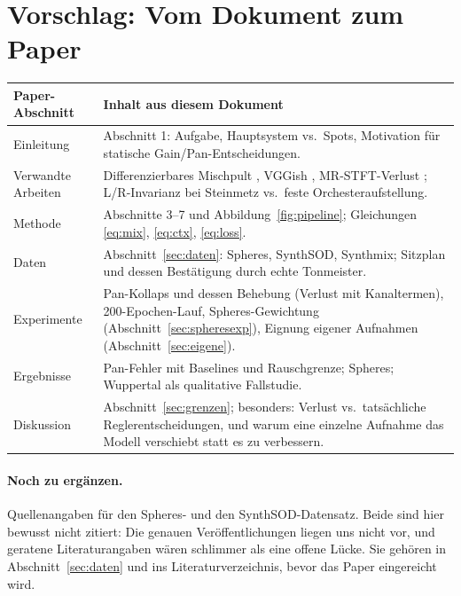 \documentclass[11pt,a4paper]{article}
\begin{document}
\section{Vorschlag: Vom Dokument zum Paper}

\begin{table}[h]
\centering\small
\begin{tabularx}{\linewidth}{@{}lX@{}}
\toprule
Paper-Abschnitt & Inhalt aus diesem Dokument \\
\midrule
Einleitung & Abschnitt 1: Aufgabe, Hauptsystem vs.\ Spots, Motivation für statische Gain/Pan-Entscheidungen. \\
Verwandte Arbeiten & Differenzierbares Mischpult \cite{steinmetz2021}, VGGish \cite{hershey2017}, MR-STFT-Verlust \cite{yamamoto2020,arik2019}; L/R-Invarianz bei Steinmetz vs.\ feste Orchesteraufstellung. \\
Methode & Abschnitte 3--7 und Abbildung~\ref{fig:pipeline}; Gleichungen \eqref{eq:mix}, \eqref{eq:ctx}, \eqref{eq:loss}. \\
Daten & Abschnitt~\ref{sec:daten}: Spheres, SynthSOD, Synthmix; Sitzplan und dessen Bestätigung durch echte Tonmeister. \\
Experimente & Pan-Kollaps und dessen Behebung (Verlust mit Kanaltermen), 200-Epochen-Lauf, Spheres-Gewichtung (Abschnitt~\ref{sec:spheresexp}), Eignung eigener Aufnahmen (Abschnitt~\ref{sec:eigene}). \\
Ergebnisse & Pan-Fehler mit Baselines und Rauschgrenze; Spheres; Wuppertal als qualitative Fallstudie. \\
Diskussion & Abschnitt~\ref{sec:grenzen}; besonders: Verlust vs.\ tatsächliche Reglerentscheidungen, und warum eine einzelne Aufnahme das Modell verschiebt statt es zu verbessern. \\
\bottomrule
\end{tabularx}
\end{table}

\paragraph{Noch zu ergänzen.} Quellenangaben für den Spheres- und den
SynthSOD-Datensatz. Beide sind hier bewusst nicht zitiert: Die genauen
Veröffentlichungen liegen uns nicht vor, und geratene Literaturangaben wären
schlimmer als eine offene Lücke. Sie gehören in Abschnitt~\ref{sec:daten} und
ins Literaturverzeichnis, bevor das Paper eingereicht wird.
\end{document}
